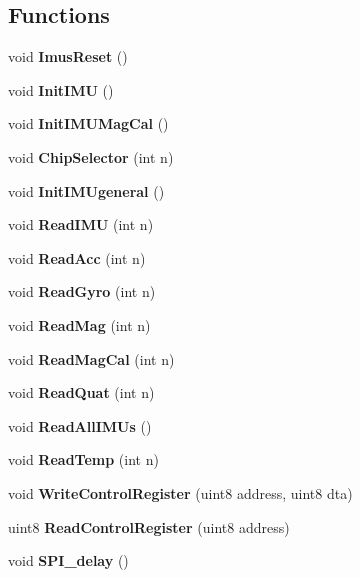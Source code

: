 \subsection*{Functions}
\begin{DoxyCompactItemize}
\item 
\mbox{\label{_i_m_u__functions_8c_a950a5a57e4188823c580d054ed2db16a}} 
void {\bfseries Imus\+Reset} ()
\item 
\mbox{\label{_i_m_u__functions_8c_ac4f81f61837e6a132dfceb5bb93b06fa}} 
void {\bfseries Init\+I\+MU} ()
\item 
\mbox{\label{_i_m_u__functions_8c_ac95975151b543b5265bc1e470aabf465}} 
void {\bfseries Init\+I\+M\+U\+Mag\+Cal} ()
\item 
\mbox{\label{_i_m_u__functions_8c_a3bb201c102e53b1b56398272fa105fbb}} 
void {\bfseries Chip\+Selector} (int n)
\item 
\mbox{\label{_i_m_u__functions_8c_a83f0630cb5ff556322c8cf56b6c6afc0}} 
void {\bfseries Init\+I\+M\+Ugeneral} ()
\item 
\mbox{\label{_i_m_u__functions_8c_a45df9ddb73de250cebfa02bf1d72bd97}} 
void {\bfseries Read\+I\+MU} (int n)
\item 
\mbox{\label{_i_m_u__functions_8c_a0290185f5b71ddb96ea13ce0a1ff48e7}} 
void {\bfseries Read\+Acc} (int n)
\item 
\mbox{\label{_i_m_u__functions_8c_ab8ae2a28912ce4a548b3603e86b22ae9}} 
void {\bfseries Read\+Gyro} (int n)
\item 
\mbox{\label{_i_m_u__functions_8c_a2ee29250f51422fa3d76df77335cce26}} 
void {\bfseries Read\+Mag} (int n)
\item 
\mbox{\label{_i_m_u__functions_8c_aad3b4856a76c623025484fe5b931bdd4}} 
void {\bfseries Read\+Mag\+Cal} (int n)
\item 
\mbox{\label{_i_m_u__functions_8c_a8eeecefb2efe7e01711fb9448c31ae76}} 
void {\bfseries Read\+Quat} (int n)
\item 
\mbox{\label{_i_m_u__functions_8c_a27bf3026dfe4cb0d6d255decc9944d71}} 
void {\bfseries Read\+All\+I\+M\+Us} ()
\item 
\mbox{\label{_i_m_u__functions_8c_ab0883cd12ebf2937fd6da478ac3ab976}} 
void {\bfseries Read\+Temp} (int n)
\item 
\mbox{\label{_i_m_u__functions_8c_af429837786eebd63058e26b3c86ac17a}} 
void {\bfseries Write\+Control\+Register} (uint8 address, uint8 dta)
\item 
\mbox{\label{_i_m_u__functions_8c_a209b21711f8765bb41e1823aab7b995b}} 
uint8 {\bfseries Read\+Control\+Register} (uint8 address)
\item 
\mbox{\label{_i_m_u__functions_8c_a26f85d9c393e73879461861d2ac87379}} 
void {\bfseries S\+P\+I\+\_\+delay} ()
\end{DoxyCompactItemize}
